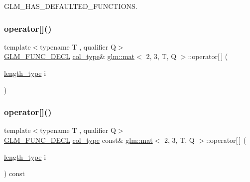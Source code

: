 G\+L\+M\+\_\+\+H\+A\+S\+\_\+\+D\+E\+F\+A\+U\+L\+T\+E\+D\+\_\+\+F\+U\+N\+C\+T\+I\+O\+NS. 

\mbox{\label{structglm_1_1mat_3_012_00_013_00_01_t_00_01_q_01_4_a946520cc2889c97e6841cbf5c36ee715}} 
\subsubsection{\texorpdfstring{operator[]()}{operator[]()}\hspace{0.1cm}{\footnotesize\ttfamily [1/2]}}
{\footnotesize\ttfamily template$<$typename T , qualifier Q$>$ \\
\hyperlink{setup_8hpp_ab2d052de21a70539923e9bcbf6e83a51}{G\+L\+M\+\_\+\+F\+U\+N\+C\+\_\+\+D\+E\+CL} \hyperlink{structglm_1_1mat_3_012_00_013_00_01_t_00_01_q_01_4_aebe4faf14ea1bc3092b4bbf591d7194e}{col\+\_\+type}\& \hyperlink{structglm_1_1mat}{glm\+::mat}$<$ 2, 3, T, Q $>$\+::operator\mbox{[}$\,$\mbox{]} (\begin{DoxyParamCaption}\item[{\hyperlink{structglm_1_1mat_3_012_00_013_00_01_t_00_01_q_01_4_ad2e2433ba375abcd6bada873f8ea2de1}{length\+\_\+type}}]{i }\end{DoxyParamCaption})}

\mbox{\label{structglm_1_1mat_3_012_00_013_00_01_t_00_01_q_01_4_abef4a7f73eb38bb050aad6894e1189d8}} 
\subsubsection{\texorpdfstring{operator[]()}{operator[]()}\hspace{0.1cm}{\footnotesize\ttfamily [2/2]}}
{\footnotesize\ttfamily template$<$typename T , qualifier Q$>$ \\
\hyperlink{setup_8hpp_ab2d052de21a70539923e9bcbf6e83a51}{G\+L\+M\+\_\+\+F\+U\+N\+C\+\_\+\+D\+E\+CL} \hyperlink{structglm_1_1mat_3_012_00_013_00_01_t_00_01_q_01_4_aebe4faf14ea1bc3092b4bbf591d7194e}{col\+\_\+type} const\& \hyperlink{structglm_1_1mat}{glm\+::mat}$<$ 2, 3, T, Q $>$\+::operator\mbox{[}$\,$\mbox{]} (\begin{DoxyParamCaption}\item[{\hyperlink{structglm_1_1mat_3_012_00_013_00_01_t_00_01_q_01_4_ad2e2433ba375abcd6bada873f8ea2de1}{length\+\_\+type}}]{i }\end{DoxyParamCaption}) const}



